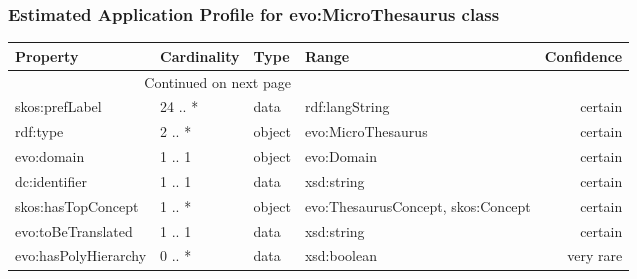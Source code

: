 \documentclass[10pt,a4paper,titlepage,final]{article}
\begin{document}
\subsubsection{Estimated Application Profile for evo:MicroThesaurus class}
\begin{tabularx}{\textwidth}{lllXr}
\toprule
             Property & Cardinality &    Type &                               Range & Confidence \\
\midrule
\endhead
\midrule
\multicolumn{3}{r}{{Continued on next page}} \\
\midrule
\endfoot

\bottomrule
\endlastfoot
       skos:prefLabel &     24 .. * &    data &                      rdf:langString &    certain \\
             rdf:type &      2 .. * &  object &                  evo:MicroThesaurus &    certain \\
           evo:domain &      1 .. 1 &  object &                          evo:Domain &    certain \\
        dc:identifier &      1 .. 1 &    data &                          xsd:string &    certain \\
   skos:hasTopConcept &      1 .. * &  object &  evo:ThesaurusConcept, skos:Concept &    certain \\
   evo:toBeTranslated &      1 .. 1 &    data &                          xsd:string &    certain \\
 evo:hasPolyHierarchy &      0 .. * &    data &                         xsd:boolean &  very rare \\
\end{tabularx}
\end{document}

